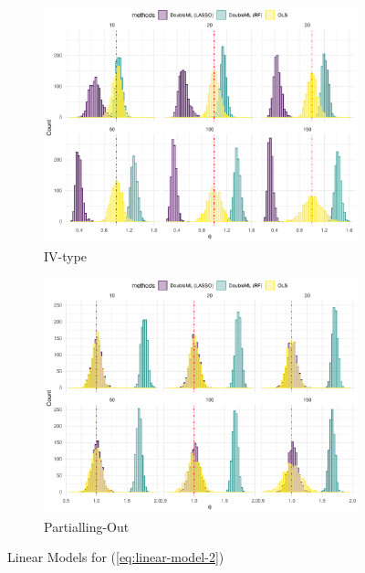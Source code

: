 \documentclass[en,12pt,mtpro2]{elegantpaper}
\begin{document}
\begin{figure}[htp]
    \centering
    \begin{subfigure}{.41\textwidth}
        \centering
        \includegraphics[width=\linewidth]{figures/simulation-linear6 (IV-type).pdf}
        \caption{IV-type}
    \end{subfigure}
    \begin{subfigure}{.41\textwidth}
        \centering
        \includegraphics[width=\linewidth]{figures/simulation-linear6 (partialling out).pdf}
        \caption{Partialling-Out}
    \end{subfigure}
    \caption{Linear Models for (\ref{eq:linear-model-2})}
\end{figure}
\clearpage
\end{document}
